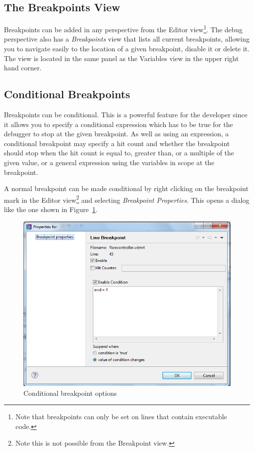 \documentclass{overturerepchap}
\begin{document}
\subsection{The Breakpoints View}

Breakpoints can be added in any perspective from the Editor view\footnote{Note that
breakpoints can only be set on lines that contain executable code.}.
The debug perspective also has a \emph{Breakpoints} view that lists all current
breakpoints, allowing you to navigate easily to the location of a given breakpoint,
disable it or delete it. The view is located in
the same panel as the Variables view in the upper right hand corner.


\subsection{Conditional Breakpoints}
\label{sec:userguide:breakpoints}

Breakpoints can be conditional. This is a powerful feature for the
developer since it allows you to specify a conditional expression
which has to be true for the debugger to stop at the given breakpoint.
As well as using an expression, a conditional breakpoint may specify a
hit count and whether the breakpoint should stop when the hit count is
equal to, greater than, or a multiple of the given value, or a general
expression using the variables in scope at the breakpoint.

A normal breakpoint can be made conditional by right clicking on the breakpoint
mark in the Editor view\footnote{Note this is not possible from the Breakpoint view.}
and selecting \emph{Breakpoint Properties}. This opens a dialog like the one shown in
Figure~\ref{fig:userguide:BreakpointConditional}.

\begin{figure}[htp]
\begin{center}
  \includegraphics[width=.6\textwidth]{figures/Breakpointconditional}
  \caption{Conditional breakpoint options}
  \label{fig:userguide:BreakpointConditional}
\end{center}
\end{figure}
\end{document}
